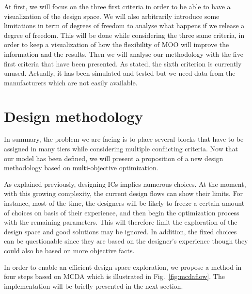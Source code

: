 At first, we will focus on the three first criteria in order to be able to have a visualization of the design space. We will also arbitrarily introduce some limitations in term of degrees of freedom to analyse what happens if we release a degree of freedom. This will be done while considering the three same criteria, in order to keep a visualization of how the flexibility of MOO will improve the information and the results. Then we will analyse our methodology with the five first criteria that have been presented. As stated, the sixth criterion is currently unused. Actually, it has been simulated and tested but we need data from the manufacturers which are not easily available.

\section{Design methodology}
In summary, the problem we are facing is to place several blocks that have to be assigned in many tiers while considering multiple conflicting criteria. Now that our model has been defined, we will present a proposition of a new design methodology based on multi-objective optimization.

As explained previously, designing ICs implies numerous choices. At the moment, with this growing complexity, the current design flows can show their limits. For instance, most of the time, the designers will be likely to freeze a certain amount of choices on basis of their experience, and then begin the optimization process with the remaining parameters. This will therefore limit the exploration of the design space and good solutions may be ignored. In addition, the fixed choices can be questionable since they are based on the designer's experience though they could also be based on more objective facts.

In order to enable an efficient design space exploration, we propose a method in four steps based on MCDA which is illustrated in Fig.~\ref{fig:mcdaflow}. The implementation will be briefly presented in the next section.

